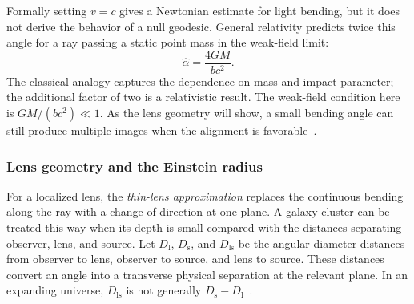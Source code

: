Formally setting $v=c$ gives a Newtonian estimate for light bending, but it does not derive the behavior of a null geodesic. General relativity predicts twice this angle for a ray passing a static point mass in the weak-field limit:
\begin{equation}
    \widehat\alpha=\frac{4GM}{bc^2}.
    \label{eq:point-mass-deflection}
\end{equation}
The classical analogy captures the dependence on mass and impact parameter; the additional factor of two is a relativistic result. The weak-field condition here is $GM/(bc^2)\ll1$. As the lens geometry will show, a small bending angle can still produce multiple images when the alignment is favorable~\cite{yoo_weak_2026,bartelmann_weak_2001}.

\subsubsection{Lens geometry and the Einstein radius}


For a localized lens, the \emph{thin-lens approximation} replaces the continuous bending along the ray with a change of direction at one plane. A galaxy cluster can be treated this way when its depth is small compared with the distances separating observer, lens, and source. Let $D_{\mathrm{l}}$, $D_{\mathrm{s}}$, and $D_{\mathrm{ls}}$ be the angular-diameter distances from observer to lens, observer to source, and lens to source. These distances convert an angle into a transverse physical separation at the relevant plane. In an expanding universe, $D_{\mathrm{ls}}$ is not generally $D_{\mathrm{s}}-D_{\mathrm{l}}$~\cite{bartelmann_weak_2001,schneider_weak_2006}.

